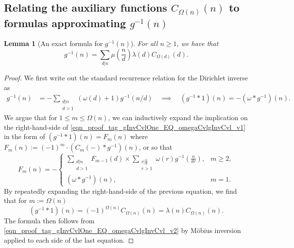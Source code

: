\documentclass[11pt,reqno,a4letter]{article}
\numberwithin{figure}{section}
\numberwithin{table}{section}
\theoremstyle{plain}
\newtheorem{lemma}[theorem]{Lemma}
\numberwithin{theorem}{section}
\theoremstyle{definition}
\begin{document}
\subsection{Relating the auxiliary functions $C_{\Omega(n)}(n)$ to formulas approximating $g^{-1}(n)$} 
\label{subSection_Relating_CknFuncs_to_gInvn} 

\begin{lemma}[An exact formula for $g^{-1}(n)$] 
\label{lemma_AnExactFormulaFor_gInvByMobiusInv_v1} 
For all $n \geq 1$, we have that 
\[
g^{-1}(n) = \sum_{d|n} \mu\left(\frac{n}{d}\right) \lambda(d) C_{\Omega(d)}(d). 
\]
\end{lemma}
\begin{proof} 
We first write out the standard recurrence relation for the Dirichlet inverse as 
\begin{align} 
\label{eqn_proof_tag_gInvCvlOne_EQ_omegaCvlgInvCvl_v1} 
g^{-1}(n) & = - \sum_{\substack{d|n \\ d>1}} (\omega(d) + 1) g^{-1}(n/d) 
     \quad\implies\quad 
     (g^{-1} \ast 1)(n) = -(\omega \ast g^{-1})(n). 
\end{align} 
We argue that for $1 \leq m \leq \Omega(n)$, we can inductively expand the 
implication on the right-hand-side of \eqref{eqn_proof_tag_gInvCvlOne_EQ_omegaCvlgInvCvl_v1} 
in the form of $(g^{-1} \ast 1)(n) = F_m(n)$ where 
$F_m(n) := (-1)^{m} \cdot (C_m(-) \ast g^{-1})(n)$, or so that 
\[
F_m(n) = - 
     \begin{cases} 
     \sum\limits_{\substack{d|n \\ d > 1}} F_{m-1}(d) \times \sum\limits_{\substack{r|\frac{n}{d} \\ r > 1}} 
     \omega(r) g^{-1}\left(\frac{n}{dr}\right), & m \geq 2, \\ 
     (\omega \ast g^{-1})(n), & m = 1. 
     \end{cases} 
\]
By repeatedly expanding the right-hand-side of the previous equation, 
we find that for $m := \Omega(n)$ 
\begin{equation} 
\label{eqn_proof_tag_gInvCvlOne_EQ_omegaCvlgInvCvl_v2} 
(g^{-1} \ast 1)(n) = (-1)^{\Omega(n)} C_{\Omega(n)}(n) = \lambda(n) C_{\Omega(n)}(n). 
\end{equation} 
The formula then follows from \eqref{eqn_proof_tag_gInvCvlOne_EQ_omegaCvlgInvCvl_v2} 
by M\"obius inversion applied to each side of the last equation. 
\end{proof} 
\end{document}
